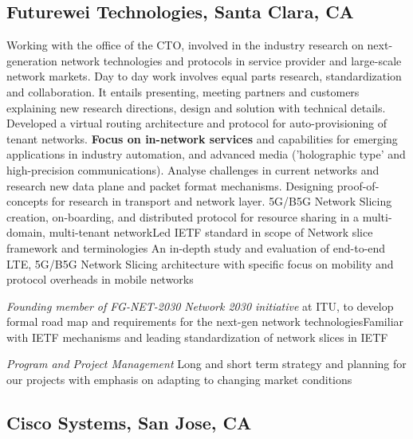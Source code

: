 \documentclass[11pt,a4paper,sans]{moderncv} %
\begin{document}
\subsection{Futurewei Technologies, Santa Clara, CA}
{Working with the office of the CTO, involved in the industry research on next-generation network technologies and protocols in service provider and large-scale network markets. Day to day work involves equal parts research, standardization and collaboration. It entails presenting, meeting partners and customers explaining new research directions, design and solution with technical details.\\
}
{Developed a virtual routing architecture and protocol for auto-provisioning of tenant networks. 
}{}
{\textbf{Focus on in-network services} and capabilities for emerging applications in industry automation, and advanced media ('holographic type' and high-precision communications). Analyse challenges in current networks and research new data plane and packet format mechanisms. Designing proof-of-concepts for research in transport and network layer. 
}{}
{5G/B5G Network Slicing creation, on-boarding, and  distributed protocol for resource sharing in a multi-domain, multi-tenant network}{Led IETF standard in scope of Network slice framework and terminologies
} {}
{An in-depth study and evaluation of end-to-end LTE, 5G/B5G Network Slicing architecture with specific focus on mobility and protocol overheads in mobile networks
} {}

 {\textit{Founding member of FG-NET-2030}}{}
 {\emph{Network 2030 initiative} at ITU, to develop formal road map and requirements for the next-gen network technologies}{Familiar with IETF mechanisms and leading standardization of network slices in IETF
 }{}

 {\textit{Program and Project Management}}{}{}
{Long and short term strategy and planning for our projects with emphasis on adapting to  changing market conditions
}{}
\subsection{Cisco Systems, San Jose, CA}
\end{document}
